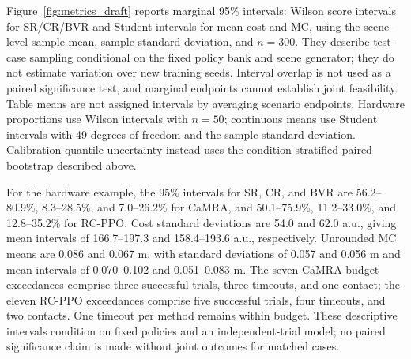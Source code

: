 \documentclass[conference]{IEEEtran}
\begin{document}
Figure~\ref{fig:metrics_draft} reports marginal 95\% intervals: Wilson
score intervals for SR/CR/BVR and Student intervals for mean cost and MC,
using the scene-level sample mean, sample standard deviation, and $n=300$.
They describe test-case sampling conditional on the fixed policy bank and
scene generator; they do not estimate variation over new training seeds.
Interval overlap is not used as a paired significance test, and marginal
endpoints cannot establish joint feasibility. Table means are not assigned
intervals by averaging scenario endpoints. Hardware proportions use
Wilson intervals with $n=50$; continuous means use Student intervals with
49 degrees of freedom and the sample standard deviation. Calibration quantile uncertainty instead uses the
condition-stratified paired bootstrap described above.

For the hardware example, the 95\% intervals for SR, CR, and BVR are
56.2--80.9\%, 8.3--28.5\%, and 7.0--26.2\% for CaMRA, and
50.1--75.9\%, 11.2--33.0\%, and 12.8--35.2\% for RC-PPO.
Cost standard deviations are 54.0 and 62.0 a.u., giving mean intervals of
166.7--197.3 and 158.4--193.6 a.u., respectively. Unrounded MC means are
0.086 and 0.067 m, with standard deviations of 0.057 and 0.056 m and mean
intervals of 0.070--0.102 and 0.051--0.083 m.
The seven CaMRA budget exceedances comprise three successful trials, three
timeouts, and one contact; the eleven RC-PPO exceedances comprise five successful
trials, four timeouts, and two contacts. One timeout per method remains within
budget. These descriptive intervals condition on fixed policies and an
independent-trial model; no paired significance claim is made without joint
outcomes for matched cases.
\end{document}
